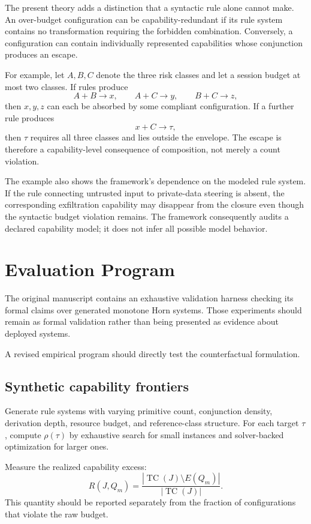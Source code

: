 \documentclass[11pt]{article}
\newcommand{\TC}{\operatorname{TC}}
\newcommand{\rhoCF}{\rho}
\begin{document}
The present theory adds a distinction that a syntactic rule alone cannot make. An over-budget configuration can be capability-redundant if its rule system contains no transformation requiring the forbidden combination. Conversely, a configuration can contain individually represented capabilities whose conjunction produces an escape.

For example, let $A,B,C$ denote the three risk classes and let a session budget at most two classes. If rules produce
\[
A+B\to x,\qquad
A+C\to y,\qquad
B+C\to z,
\]
then $x,y,z$ can each be absorbed by some compliant configuration. If a further rule produces
\[
x+C\to\tau,
\]
then $\tau$ requires all three classes and lies outside the envelope. The escape is therefore a capability-level consequence of composition, not merely a count violation.

The example also shows the framework's dependence on the modeled rule system. If the rule connecting untrusted input to private-data steering is absent, the corresponding exfiltration capability may disappear from the closure even though the syntactic budget violation remains. The framework consequently audits a declared capability model; it does not infer all possible model behavior.

\section{Evaluation Program}

The original manuscript contains an exhaustive validation harness checking its formal claims over generated monotone Horn systems. Those experiments should remain as formal validation rather than being presented as evidence about deployed systems.

A revised empirical program should directly test the counterfactual formulation.

\subsection{Synthetic capability frontiers}

Generate rule systems with varying primitive count, conjunction density, derivation depth, resource budget, and reference-class structure. For each target $\tau$, compute $\rhoCF(\tau)$ by exhaustive search for small instances and solver-backed optimization for larger ones.

Measure the realized capability excess:
\[
R(J,Q_m)=
\frac{
|\TC(J)\setminus E(Q_m)|
}{
|\TC(J)|
}.
\]
This quantity should be reported separately from the fraction of configurations that violate the raw budget.
\end{document}
